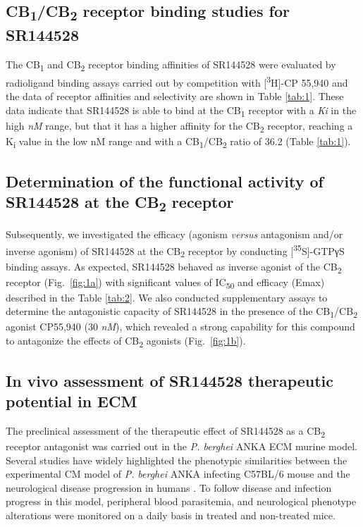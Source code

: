 \documentclass[empirical, authordate]{jote-new-article}
\begin{document}
\subsection{CB\textsubscript{1}/CB\textsubscript{2} receptor binding studies for SR144528}

The CB\textsubscript{1} and CB\textsubscript{2} receptor binding affinities of SR144528 were evaluated by radioligand binding assays carried out by competition with [\textsuperscript{3}H]-CP 55,940 and the data of receptor affinities and selectivity are shown in Table \ref{tab:1}. These data indicate that SR144528 is able to bind at the CB\textsubscript{1} receptor with a \emph{Ki} in the high \emph{nM} range, but that it has a higher affinity for the CB\textsubscript{2} receptor, reaching a K\textsubscript{i} value in the low nM range and with a CB\textsubscript{1}/CB\textsubscript{2} ratio of 36.2 (Table \ref{tab:1}).






\subsection{Determination of the functional activity of SR144528 at the CB\textsubscript{2} receptor}

Subsequently, we investigated the efficacy (agonism \emph{versus} antagonism and/or inverse agonism) of SR144528 at the CB\textsubscript{2 }receptor by conducting [\textsuperscript{35}S]-GTPγS binding assays. As expected, SR144528 behaved as inverse agonist of the CB\textsubscript{2} receptor (Fig.~\ref{fig:1a}) with significant values of IC\textsubscript{50} and efficacy (Emax) described in the Table \ref{tab:2}. We also conducted supplementary assays to determine the antagonistic capacity of SR144528 in the presence of the CB\textsubscript{1}/CB\textsubscript{2} agonist CP55,940 (30 \emph{nM}), which revealed a strong capability for this compound to antagonize the effects of CB\textsubscript{2} agonists (Fig.~\ref{fig:1b}).


\subsection{In vivo assessment of SR144528 therapeutic potential in ECM}




The preclinical assessment of the therapeutic effect of SR144528 as a CB\textsubscript{2} receptor antagonist was carried out in the \emph{P. berghei }ANKA ECM murine model. Several studies have widely highlighted the phenotypic similarities between the experimental CM model of \emph{P. }\emph{berghei}\emph{ }ANKA infecting C57BL/6 mouse and the neurological disease progression in humans \parencite{DeSouza2010, Hunt2003, Lou2001,Medana2006}. To follow disease and infection progress in this model, peripheral blood parasitemia, and neurological phenotype alterations were monitored on a daily basis in treated and non-treated mice.
\end{document}

